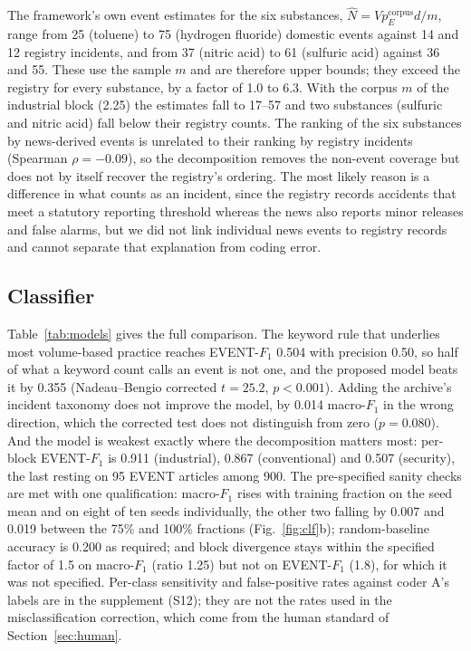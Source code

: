 \documentclass[1p,times]{elsarticle}
\begin{document}
The framework's own event estimates for the six substances, $\hat N = V p_E^{\mathrm{corpus}} d / m$, range from 25 (toluene) to 75 (hydrogen fluoride) domestic events against 14 and 12 registry incidents, and from 37 (nitric acid) to 61 (sulfuric acid) against 36 and 55. These use the sample $m$ and are therefore upper bounds; they exceed the registry for every substance, by a factor of 1.0 to 6.3. With the corpus $m$ of the industrial block (2.25) the estimates fall to 17--57 and two substances (sulfuric and nitric acid) fall below their registry counts. The ranking of the six substances by news-derived events is unrelated to their ranking by registry incidents (Spearman $\rho = -0.09$), so the decomposition removes the non-event coverage but does not by itself recover the registry's ordering. The most likely reason is a difference in what counts as an incident, since the registry records accidents that meet a statutory reporting threshold whereas the news also reports minor releases and false alarms, but we did not link individual news events to registry records and cannot separate that explanation from coding error.

\subsection{Classifier}
\label{sec:clf}
Table~\ref{tab:models} gives the full comparison. The keyword rule that underlies most volume-based practice reaches EVENT-$F_1$ 0.504 with precision 0.50, so half of what a keyword count calls an event is not one, and the proposed model beats it by 0.355 (Nadeau--Bengio corrected $t = 25.2$, $p < 0.001$). Adding the archive's incident taxonomy does not improve the model, by 0.014 macro-$F_1$ in the wrong direction, which the corrected test does not distinguish from zero ($p = 0.080$). And the model is weakest exactly where the decomposition matters most: per-block EVENT-$F_1$ is 0.911 (industrial), 0.867 (conventional) and 0.507 (security), the last resting on 95 EVENT articles among 900. The pre-specified sanity checks are met with one qualification: macro-$F_1$ rises with training fraction on the seed mean and on eight of ten seeds individually, the other two falling by 0.007 and 0.019 between the 75\% and 100\% fractions (Fig.~\ref{fig:clf}b); random-baseline accuracy is 0.200 as required; and block divergence stays within the specified factor of 1.5 on macro-$F_1$ (ratio 1.25) but not on EVENT-$F_1$ (1.8), for which it was not specified. Per-class sensitivity and false-positive rates against coder A's labels are in the supplement (S12); they are not the rates used in the misclassification correction, which come from the human standard of Section~\ref{sec:human}.
\end{document}

